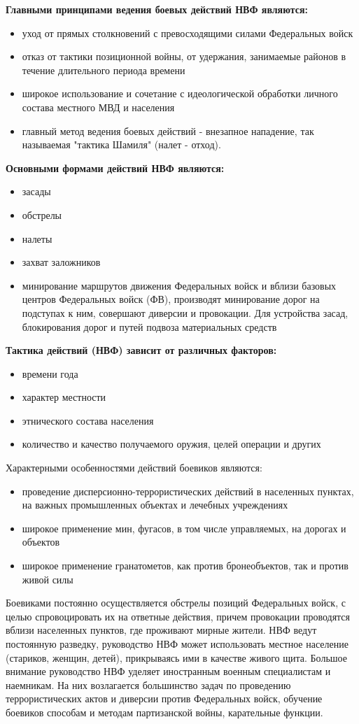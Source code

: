 \documentclass[12pt,a4paper]{report}
\begin{document}
\textbf{Главными принципами ведения боевых действий НВФ являются: }
\begin{itemize}
	\item уход от прямых столкновений с превосходящими силами Федеральных войск 
	\item отказ от тактики позиционной войны, от удержания, занимаемые районов в течение длительного периода времени 
	\item широкое использование и сочетание с идеологической обработки личного состава местного МВД и населения 
	\item главный метод ведения боевых действий - внезапное нападение, так называемая "тактика Шамиля" (налет - отход). 
\end{itemize}
\textbf{Основными формами действий НВФ являются: }
\begin{itemize}
	\item засады 
	\item обстрелы 
	\item налеты 
	\item захват заложников 
	\item минирование маршрутов движения Федеральных войск и вблизи базовых центров Федеральных войск (ФВ), производят минирование дорог на подступах к ним, совершают диверсии и провокации. Для устройства засад, блокирования дорог и путей подвоза материальных средств 
\end{itemize}
\textbf{Тактика действий (НВФ) зависит от различных факторов: }
\begin{itemize}
	\item времени года 
	\item характер местности 
	\item этнического состава населения 
	\item количество и качество получаемого оружия, целей операции и других 
\end{itemize}
Характерными особенностями действий боевиков являются: 
\begin{itemize}
	\item проведение дисперсионно-террористических действий в населенных пунктах, на важных промышленных объектах и лечебных учреждениях 
	\item широкое применение мин, фугасов, в том числе управляемых, на дорогах и объектов 
	\item широкое применение гранатометов, как против бронеобъектов, так и против живой силы 
\end{itemize}

Боевиками постоянно осуществляется обстрелы позиций Федеральных войск, с целью спровоцировать их на ответные действия, причем провокации проводятся вблизи населенных пунктов, где проживают мирные жители. НВФ ведут постоянную разведку, руководство НВФ может использовать местное население (стариков, женщин, детей), прикрываясь ими в качестве живого щита. Большое внимание руководство НВФ уделяет иностранным военным специалистам и наемникам. На них возлагается большинство задач по проведению террористических актов и диверсии против Федеральных войск, обучение боевиков способам и методам партизанской войны, карательные функции. 
\end{document}
